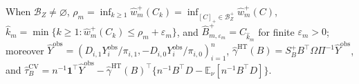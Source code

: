 When \(\mathcal B_Z\ne\varnothing\), \(\rho_m=\inf_{k\ge1}\widehat w_m^+(C_k)=\inf_{[C]_+\in\mathcal B_Z^+}\widehat w_m^+(C)\), \(\widehat k_m=\min\{k\ge1:\widehat w_m^+(C_k)\le\rho_m+\varepsilon_m\}\), and \(\widehat B_{m,\varepsilon_m}^+=C_{\widehat k_m}\) for finite \(\varepsilon_m>0\); moreover \(\widehat Y^{\mathrm{obs}}=(D_{i,1}Y_i^{\mathrm{obs}}/\pi_{i,1},-D_{i,0}Y_i^{\mathrm{obs}}/\pi_{i,0})_{i=1}^n\), \(\widehat\gamma^{\mathrm{HT}}(B)=S_B^+B^{\top}\Omega\Pi^{-1}\widehat Y^{\mathrm{obs}}\), and \(\widehat\tau_B^{\mathrm{CV}}=n^{-1}\mathbf1^{\top}\widehat Y^{\mathrm{obs}}-\widehat\gamma^{\mathrm{HT}}(B)^{\top}\{n^{-1}B^{\top}D-\mathbb E_\nu[n^{-1}B^{\top}D]\}\).